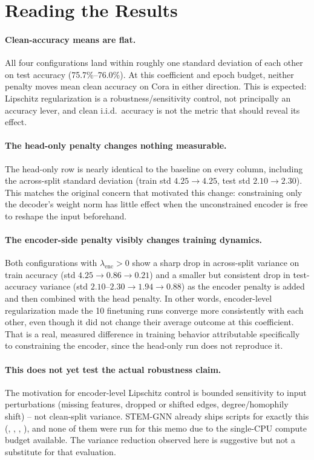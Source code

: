 \documentclass{article}
\begin{document}
\section{Reading the Results}

\paragraph{Clean-accuracy means are flat.} All four configurations land
within roughly one standard deviation of each other on test accuracy
(75.7\%--76.0\%). At this coefficient and epoch budget, neither penalty
moves mean clean accuracy on Cora in either direction. This is expected:
Lipschitz regularization is a robustness/sensitivity control, not
principally an accuracy lever, and clean i.i.d.\ accuracy is not the metric
that should reveal its effect.

\paragraph{The head-only penalty changes nothing measurable.} The
head-only row is nearly identical to the baseline on every column,
including the across-split standard deviation (train std $4.25 \to 4.25$,
test std $2.10 \to 2.30$). This matches the original concern that motivated
this change: constraining only the decoder's weight norm has little
effect when the unconstrained encoder is free to reshape the input
beforehand.

\paragraph{The encoder-side penalty visibly changes training dynamics.}
Both configurations with $\lambda_{\text{enc}} > 0$ show a sharp drop in
across-split variance on train accuracy (std $4.25 \to 0.86 \to 0.21$) and
a smaller but consistent drop in test-accuracy variance (std
$2.10\text{--}2.30 \to 1.94 \to 0.88$) as the encoder penalty is added and
then combined with the head penalty. In other words, encoder-level
regularization made the 10 finetuning runs converge more consistently with
each other, even though it did not change their average outcome at this
coefficient. That is a real, measured difference in training behavior
attributable specifically to constraining the encoder, since the head-only
run does not reproduce it.

\paragraph{This does not yet test the actual robustness claim.} The
motivation for encoder-level Lipschitz control is bounded sensitivity to
input perturbations (missing features, dropped or shifted edges,
degree/homophily shift) -- not clean-split variance. STEM-GNN already ships
scripts for exactly this (,
,
,
), and none of them were run for
this memo due to the single-CPU compute budget available. The variance
reduction observed here is suggestive but not a substitute for that
evaluation.
\end{document}
